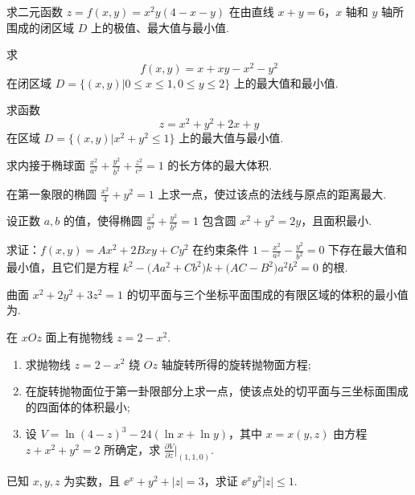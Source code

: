 	\begin{ti}
		求二元函数 $z = f(x,y) = x^{2}y(4 - x - y)$ 在由直线 $x + y = 6$，$x$ 轴和 $y$ 轴所围成的闭区域 $D$ 上的极值、最大值与最小值.
	\end{ti}

	\begin{ti}
		求
		\[
			f(x,y) = x + xy - x^{2} - y^{2}
		\]
		在闭区域 $D = \{ (x,y) | 0 \leq x \leq 1, 0 \leq y \leq 2 \}$ 上的最大值和最小值.
	\end{ti}

	\begin{ti}
		求函数
		\[
			z = x^{2} + y^{2} + 2x + y
		\]
		在区域 $D = \bigl\{ (x,y) \bigl| x^{2} + y^{2} \leq 1 \bigr\}$ 上的最大值与最小值.
	\end{ti}

	\begin{ti}
		求内接于椭球面 $\frac{x^{2}}{a^{2}} + \frac{y^{2}}{b^{2}} + \frac{z^{2}}{c^{2}} = 1$ 的长方体的最大体积.
	\end{ti}

	\begin{ti}
		在第一象限的椭圆 $\frac{x^{2}}{4} + y^{2} = 1$ 上求一点，使过该点的法线与原点的距离最大.
	\end{ti}

	\begin{ti}
		设正数 $a,b$ 的值，使得椭圆 $\frac{x^{2}}{a^{2}} + \frac{y^{2}}{b^{2}} = 1$ 包含圆 $x^{2} + y^{2} = 2y$，且面积最小.
	\end{ti}

	\begin{ti}
		求证：$f(x,y) = Ax^{2} + 2Bxy + Cy^{2}$ 在约束条件 $1 - \frac{x^{2}}{a^{2}} - \frac{y^{2}}{b^{2}} = 0$ 下存在最大值和最小值，且它们是方程 $k^{2} - \bigl( Aa^{2} + Cb^{2} \bigr)k + \bigl( AC - B^{2} \bigr)a^{2}b^{2} = 0$ 的根.
	\end{ti}

	\begin{ti}
		曲面 $x^{2} + 2y^{2} + 3z^{2} = 1$ 的切平面与三个坐标平面围成的有限区域的体积的最小值为\htwo.
	\end{ti}

	\begin{ti}
		在 $xOz$ 面上有抛物线 $z = 2 - x^{2}$.
		\begin{enumerate}
			\item 求抛物线 $z = 2 - x^{2}$ 绕 $Oz$ 轴旋转所得的旋转抛物面方程;
			\item 在旋转抛物面位于第一卦限部分上求一点，使该点处的切平面与三坐标面围成的四面体的体积最小;
			\item 设 $V = \ln (4 - z)^{3} - 24 (\ln x + \ln y)$，其中 $x = x(y,z)$ 由方程 $z + x^{2} + y^{2} = 2$ 所确定，求 $\frac{\partial V}{\partial z}\bigl|_{(1,1,0)}$.
		\end{enumerate}
	\end{ti}

	\begin{ti}
		已知 $x,y,z$ 为实数，且 $\ee^{x} + y^{2} + |z| = 3$，求证 $\ee^{x} y^{2} |z| \leq 1$.
	\end{ti}